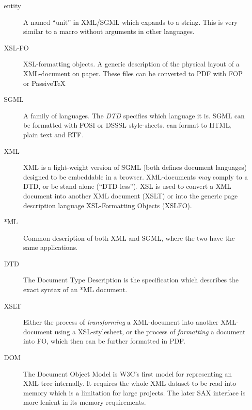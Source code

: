 \begin{description}

\item[entity] A named ``unit'' in XML/SGML which expands to a string.
  This is very similar to a macro without arguments in other
  languages.
  
\item[XSL-FO] XSL-formatting objects.  A generic description of the physical
  layout of a XML-document on paper.  These files can be converted to
  PDF with FOP or PassiveTeX
  
\item[SGML] A family of languages.  The \textit{DTD} specifies which
  language it is.  SGML can be formatted with FOSI or DSSSL
  style-sheets.   can format to HTML, plain text and
  RTF. 
  
\item[XML]
  
XML is a light-weight version of SGML (both defines document
languages) designed to be embeddable in a browser.  XML-documents
\textit{may} comply to a DTD, or be stand-alone (``DTD-less'').  XSL
is used to convert a XML document into another XML document (XSLT) or
into the generic page description language XSL-Formatting Objects
(XSLFO).


\item[*ML] Common description of both XML and SGML, where the two have
  the same applications.

\item[DTD] The Document Type Description is the specification
  which describes the exact syntax of an *ML document.

  
\item[XSLT] Either the process of \textit{transforming} a XML-document
  into another XML-document using a XSL-stylesheet, or the process of
  \textit{formatting} a document into FO, which then can be further
  formatted in PDF.
  
\item[DOM] The Document Object Model is W3C's first model for
  representing an XML tree internally.  It requires the whole XML
  dataset to be read into memory which is a limitation for large
  projects.  The later SAX interface is more lenient in its memory
  requirements.
  

\end{description}
